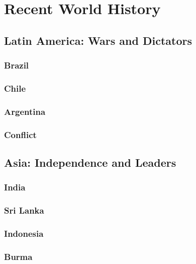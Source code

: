 \chapter{Recent World History}

\section{Latin America: Wars and Dictators}

\subsection*{Brazil}

\subsection*{Chile}

\subsection*{Argentina}

\subsection*{Conflict}

\section{Asia: Independence and Leaders}

\subsection*{India}

\subsection*{Sri Lanka}

\subsection*{Indonesia}

\subsection*{Burma}

